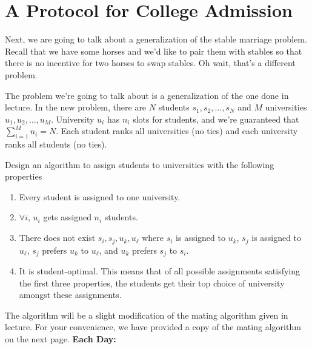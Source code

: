 \documentclass[12pt]{article}
\begin{document}


\section{A Protocol for College Admission}

Next, we are going to talk about a generalization of the stable
marriage problem. Recall that we have some horses and we'd like to
pair them with stables so that there is no incentive for two horses to
swap stables. Oh wait, that's a different problem.

The problem we're going to talk about is a generalization of the one
done in lecture. In the new problem, there are $N$ students $s_1, s_2,
\ldots, s_N$ and $M$ universities $u_1, u_2, \ldots, u_M$. University
$u_i$ has $n_i$ slots for students, and we're guaranteed that
$\sum_{i=1}^M n_i = N$. Each student ranks all universities (no ties)
and each university ranks all students (no ties).

Design an algorithm to assign students to universities with the following properties
\begin{enumerate}
\item Every student is assigned to one university.
\item $\forall i$, $u_i$ gets assigned $n_i$ students.
\item There does not exist $s_i, s_j, u_k, u_{\ell}$ where $s_i$ is assigned to $u_k$, $s_j$ is assigned to $u_{\ell}$, $s_j$ prefers $u_k$ to $u_{\ell}$, and $u_k$ prefers $s_j$ to $s_i$. 
\item It is student-optimal. This means that of all possible assignments satisfying the first three properties, the students get their top choice of university amongst these assignments.
\end{enumerate}
The algorithm will be a slight modification of the mating algorithm given in lecture. For your convenience, we have provided a copy of the mating algorithm on the next page.
\newpage
\noindent
{\bf Each Day:}
\end{document}
